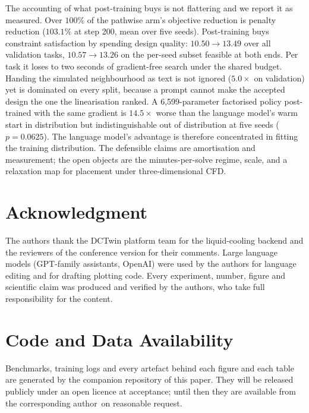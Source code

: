 \documentclass[journal]{IEEEtran}
\newif\ifblindreview
\begin{document}
The accounting of what post-training buys is not flattering and we report it as
measured.  Over $100\%$ of the pathwise arm's objective reduction is penalty
reduction ($103.1\%$ at step 200, mean over five seeds).  Post-training buys
constraint satisfaction by spending design quality: $10.50\to13.49$ over all
validation tasks, $10.57\to13.26$ on the per-seed subset feasible at both ends.
Per task it loses to two seconds of gradient-free search under the shared
budget.  Handing the simulated neighbourhood as text is not ignored ($5.0\times$ on
validation) yet is dominated on every split, because a prompt cannot make the
accepted design the one the linearisation ranked.  A 6{,}599-parameter factorised
policy post-trained with the same gradient is $14.5\times$ worse than the
language model's warm start in distribution but indistinguishable out of
distribution at five seeds ($p=0.0625$).  The language model's advantage is
therefore concentrated in fitting the training distribution.  The defensible
claims are amortisation and measurement; the open objects are the
minutes-per-solve regime, scale, and a relaxation map for placement under
three-dimensional CFD.

\ifblindreview\else
\section*{Acknowledgment}
The authors thank the DCTwin platform team for the liquid-cooling backend and
the reviewers of the conference version for their comments.  Large language
models (GPT-family assistants, OpenAI) were used by the authors for language
editing and for drafting plotting code. Every experiment, number, figure and
scientific claim was produced and verified by the authors, who take full
responsibility for the content.

\fi
\section*{Code and Data Availability}
Benchmarks, training logs and every artefact behind each figure and each table are
generated by the companion repository of this paper.  They will be released publicly
under an open licence at acceptance; until then they are available from the
\ifblindreview authors\else corresponding author\fi\ on reasonable request.
\end{document}
